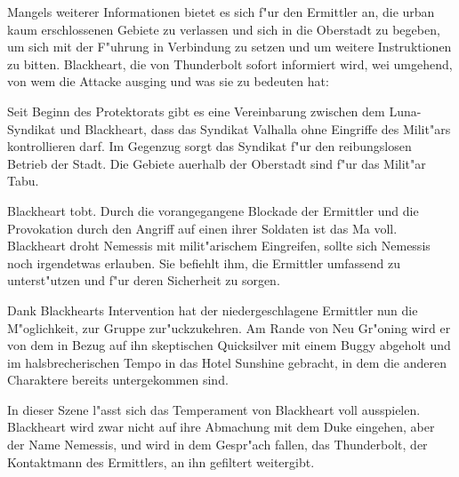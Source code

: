 Mangels weiterer Informationen bietet es sich f"ur den Ermittler an, die urban kaum erschlossenen Gebiete zu verlassen und sich in die Oberstadt zu begeben, um sich mit der F"uhrung in Verbindung zu setzen und um weitere Instruktionen zu bitten. Blackheart, die von Thunderbolt sofort informiert wird, wei\3 umgehend, von wem die Attacke ausging und was sie zu bedeuten hat:

Seit Beginn des Protektorats gibt es eine Vereinbarung zwischen dem Luna-Syndikat und Blackheart, dass das Syndikat Valhalla ohne Eingriffe des Milit"ars kontrollieren darf. Im Gegenzug sorgt das Syndikat f"ur den reibungslosen Betrieb der Stadt. Die Gebiete au\3erhalb der Oberstadt sind f"ur das Milit"ar Tabu.

Blackheart tobt. Durch die vorangegangene Blockade der Ermittler und die Provokation durch den Angriff auf einen ihrer Soldaten ist das Ma\3 voll. Blackheart droht Nemessis mit milit"arischem Eingreifen, sollte sich Nemessis noch irgendetwas erlauben. Sie befiehlt ihm, die Ermittler umfassend zu unterst"utzen und f"ur deren Sicherheit zu sorgen.

Dank Blackhearts Intervention hat der niedergeschlagene Ermittler nun die M"oglichkeit, zur Gruppe zur"uckzukehren. Am Rande von Neu Gr"oning wird er von dem in Bezug auf ihn skeptischen Quicksilver mit einem Buggy abgeholt und im halsbrecherischen Tempo in das Hotel Sunshine gebracht, in dem die anderen Charaktere bereits untergekommen sind.

\begin{remarks}
	In dieser Szene l"asst sich das Temperament von Blackheart voll ausspielen. Blackheart wird zwar nicht auf ihre Abmachung mit dem Duke eingehen, aber der Name Nemessis,  und  wird in dem Gespr"ach fallen, das Thunderbolt, der Kontaktmann des Ermittlers, an ihn gefiltert weitergibt.
\end{remarks}
